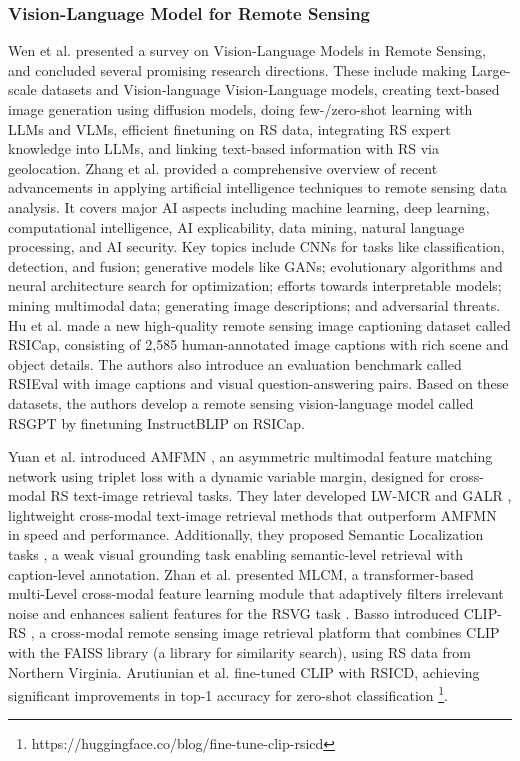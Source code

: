 \documentclass[journal]{IEEEtran}
\begin{document}
\subsubsection{Vision-Language Model for Remote Sensing}

Wen et al. \cite{wen2023visionlanguage} presented a survey on Vision-Language Models in Remote Sensing, and concluded several promising research directions. These include making Large-scale datasets and Vision-language Vision-Language models, creating text-based image generation using diffusion models, doing few-/zero-shot learning with LLMs and VLMs, efficient finetuning on RS data, integrating RS expert knowledge into LLMs, and linking text-based information with RS via geolocation. Zhang et al.\cite{airs} provided a comprehensive overview of recent advancements in applying artificial intelligence techniques to remote sensing data analysis. It covers major AI aspects including machine learning, deep learning, computational intelligence, AI explicability, data mining, natural language processing, and AI security. Key topics include CNNs for tasks like classification, detection, and fusion; generative models like GANs; evolutionary algorithms and neural architecture search for optimization; efforts towards interpretable models; mining multimodal data; generating image descriptions; and adversarial threats. Hu et al. \cite{hu2023rsgpt} made a new high-quality remote sensing image captioning dataset called RSICap, consisting of 2,585 human-annotated image captions with rich scene and object details. The authors also introduce an evaluation benchmark called RSIEval with image captions and visual question-answering pairs. Based on these datasets, the authors develop a remote sensing vision-language model called RSGPT by finetuning InstructBLIP on RSICap.  

Yuan et al. introduced AMFMN \cite{RSITMD}, an asymmetric multimodal feature matching network using triplet loss with a dynamic variable margin, designed for cross-modal RS text-image retrieval tasks. They later developed LW-MCR \cite{LW-MCR} and GALR \cite{galr}, lightweight cross-modal text-image retrieval methods that outperform AMFMN in speed and performance. Additionally, they proposed Semantic Localization tasks \cite{selo}, a weak visual grounding task enabling semantic-level retrieval with caption-level annotation. Zhan et al. presented MLCM, a transformer-based multi-Level cross-modal feature learning module that adaptively filters irrelevant noise and enhances salient features for the RSVG task \cite{rsvg}. Basso introduced CLIP-RS \cite{clip-rs}, a cross-modal remote sensing image retrieval platform that combines CLIP with the FAISS library \cite{faiss} (a library for similarity search), using RS data from Northern Virginia. Arutiunian et al. fine-tuned CLIP with RSICD, achieving significant improvements in top-1 accuracy for zero-shot classification \footnote{https://huggingface.co/blog/fine-tune-clip-rsicd}.
\end{document}
